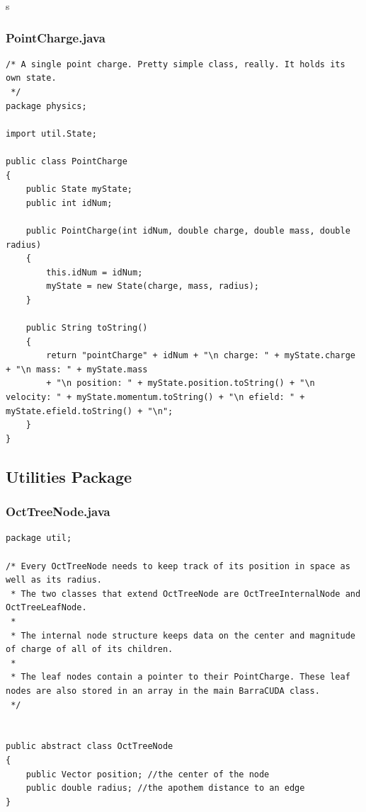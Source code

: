 s\documentclass[10pt]{article}
\begin{document}
\subsubsection{PointCharge.java}
\begin{verbatim}
/* A single point charge. Pretty simple class, really. It holds its own state.
 */
package physics;

import util.State;

public class PointCharge 
{
	public State myState;
	public int idNum;
	
	public PointCharge(int idNum, double charge, double mass, double radius)
	{
		this.idNum = idNum;
		myState = new State(charge, mass, radius);
	}
	
	public String toString()
	{
		return "pointCharge" + idNum + "\n charge: " + myState.charge + "\n mass: " + myState.mass 
		+ "\n position: " + myState.position.toString() + "\n velocity: " + myState.momentum.toString() + "\n efield: " + myState.efield.toString() + "\n";
	}
}

\end{verbatim}
\clearpage
\subsection{Utilities Package}

\subsubsection{OctTreeNode.java}
\begin{verbatim}
package util;

/* Every OctTreeNode needs to keep track of its position in space as well as its radius.
 * The two classes that extend OctTreeNode are OctTreeInternalNode and OctTreeLeafNode.
 * 
 * The internal node structure keeps data on the center and magnitude of charge of all of its children.
 * 
 * The leaf nodes contain a pointer to their PointCharge. These leaf nodes are also stored in an array in the main BarraCUDA class. 
 */


public abstract class OctTreeNode 
{
	public Vector position; //the center of the node
	public double radius; //the apothem distance to an edge
}
\end{verbatim}
\end{document}
